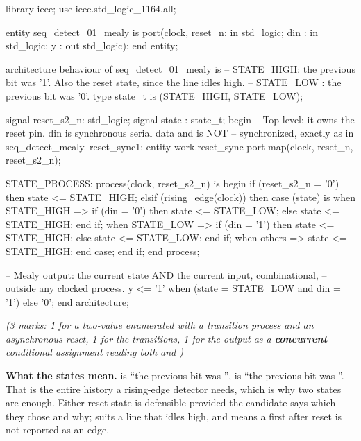 \begin{vhdlcode}
library ieee;
use ieee.std_logic_1164.all;

entity seq_detect_01_mealy is
    port(clock, reset_n: in  std_logic;
         din           : in  std_logic;
         y             : out std_logic);
end entity;

architecture behaviour of seq_detect_01_mealy is
-- STATE_HIGH: the previous bit was '1'. Also the reset state, since the line idles high.
-- STATE_LOW : the previous bit was '0'.
type state_t is (STATE_HIGH, STATE_LOW);

signal reset_s2_n: std_logic;
signal state     : state_t;
begin
    -- Top level: it owns the reset pin. din is synchronous serial data and is NOT
    -- synchronized, exactly as in seq_detect_mealy.
    reset_sync1: entity work.reset_sync
        port map(clock, reset_n, reset_s2_n);

    STATE_PROCESS: process(clock, reset_s2_n) is
    begin
        if (reset_s2_n = '0') then
            state <= STATE_HIGH;
        elsif (rising_edge(clock)) then
            case (state) is
                when STATE_HIGH =>
                    if (din = '0') then
                        state <= STATE_LOW;
                    else
                        state <= STATE_HIGH;
                    end if;
                when STATE_LOW =>
                    if (din = '1') then
                        state <= STATE_HIGH;
                    else
                        state <= STATE_LOW;
                    end if;
                when others =>
                    state <= STATE_HIGH;
            end case;
        end if;
    end process;

    -- Mealy output: the current state AND the current input, combinational,
    -- outside any clocked process.
    y <= '1' when (state = STATE_LOW and din = '1') else '0';
end architecture;
\end{vhdlcode}

{\itshape (3 marks: 1 for a two-value enumerated  with a  transition
process and an asynchronous reset, 1 for the transitions, 1 for the output as a
\textbf{concurrent} conditional assignment reading both  and )\par}

\medskip
\textbf{What the states mean.}  is ``the previous bit was '',
 is ``the previous bit was ''. That is the entire history a rising-edge
detector needs, which is why two states are enough. Either reset state is defensible provided the
candidate says which they chose and why;  suits a line that idles high, and means a
first  after reset is not reported as an edge.

